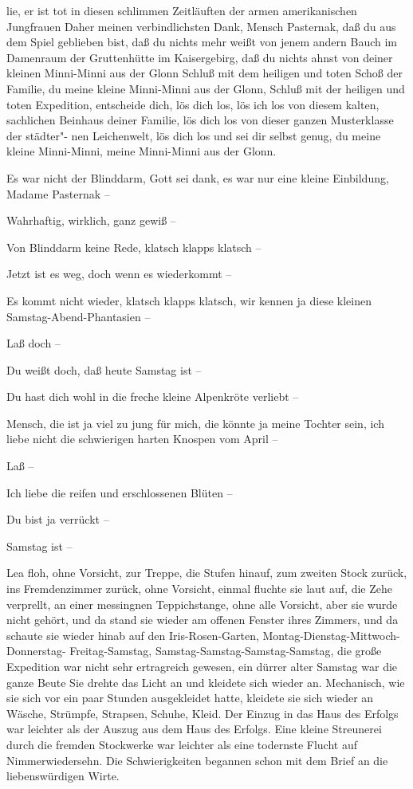 lie, er ist tot in diesen schlimmen Zeitläuften der armen
amerikanischen Jungfrauen\ausr{} Daher meinen verbindlichsten
Dank, Mensch Pasternak, daß du aus dem Spiel geblieben
bist, daß du nichts mehr weißt von jenem andern Bauch im
Damenraum der Gruttenhütte im Kaisergebirg, daß du
nichts ahnst von deiner kleinen Minni-Minni aus der Glonn\ausr{}
Schluß mit dem heiligen und toten Schoß der Familie,
du meine kleine Minni-Minni aus der Glonn, Schluß mit
der heiligen und toten Expedition, entscheide dich, lös dich
los, lös ich los von diesem kalten, sachlichen Beinhaus deiner
Familie, lös dich los von dieser ganzen Musterklasse der städter"-%
nen Leichenwelt, lös dich los und sei dir selbst genug, du
meine kleine Minni-Minni, meine Minni-Minni aus der
Glonn.

Es war nicht der Blinddarm, Gott sei dank, es war nur eine
kleine Einbildung, Madame Pasternak --

Wahrhaftig, wirklich, ganz gewiß --

Von Blinddarm keine Rede, klatsch klapps klatsch --

Jetzt ist es weg, doch wenn es wiederkommt --

Es kommt nicht wieder, klatsch klapps klatsch, wir kennen ja
diese kleinen Samstag-Abend-Phantasien --

Laß doch --

Du weißt\eingriff{eS93-1}{weißt ] weiß} doch, daß heute Samstag ist --

Du hast dich wohl in die freche kleine Alpenkröte verliebt --

Mensch, die ist ja viel zu jung für mich, die könnte ja meine
Tochter sein, ich liebe nicht die schwierigen harten Knospen
vom April --

Laß --

Ich liebe die reifen und erschlossenen Blüten --

Du bist ja verrückt --

Samstag ist --

Lea floh, ohne Vorsicht, zur Treppe, die Stufen hinauf,
zum zweiten Stock zurück, ins Fremdenzimmer zurück, ohne
Vorsicht, einmal fluchte sie laut auf, die Zehe verprellt, an
einer messingnen Teppichstange, ohne alle Vorsicht, aber sie
wurde nicht gehört, und da stand sie wieder am offenen Fenster
ihres Zimmers, und da schaute sie wieder hinab auf den
Iris-Rosen-Garten, Montag-Dienstag-Mittwoch-Donnerstag-%
Freitag-Samstag, Samstag-Samstag-Samstag-Samstag,
die große Expedition war nicht sehr ertragreich gewesen, ein
dürrer alter Samstag war die ganze Beute\punkte{} Sie drehte
das Licht an und kleidete sich wieder an. Mechanisch, wie
sie sich vor ein paar Stunden ausgekleidet hatte, kleidete sie
sich wieder an\punkte{} Wäsche, Strümpfe, Strapsen, Schuhe,
Kleid.
\abstand{}
Der Einzug in das Haus des Erfolgs war leichter als der
Auszug aus dem Haus des Erfolgs. Eine kleine Streunerei
durch die fremden Stockwerke war leichter als eine todernste
Flucht auf Nimmerwiedersehn. Die Schwierigkeiten begannen
schon mit dem Brief an die liebenswürdigen Wirte.

